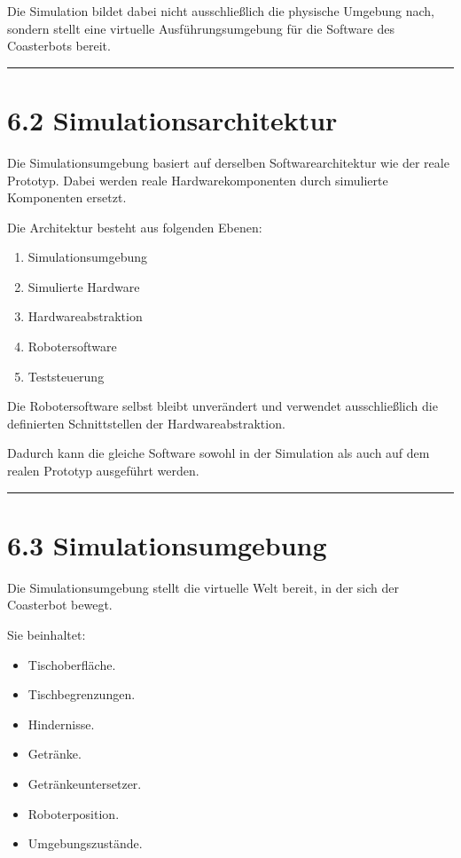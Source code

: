 \documentclass[
  a4paper,
  12pt,
  DIV=12,        %
  parskip=half,  %
  headings=small %
]{scrartcl}
\theoremstyle{definition}
\providecommand{\tightlist}{%
  \setlength{\itemsep}{0pt}\setlength{\parskip}{0pt}}
\theoremstyle{definition}
\providecommand{\tightlist}{%
  \setlength{\itemsep}{0pt}\setlength{\parskip}{0pt}}
\begin{document}
Die Simulation bildet dabei nicht ausschließlich die physische Umgebung
nach, sondern stellt eine virtuelle Ausführungsumgebung für die Software
des Coasterbots bereit.

\begin{center}\rule{0.5\linewidth}{0.5pt}\end{center}

\section{6.2 Simulationsarchitektur}\label{simulationsarchitektur-1}

Die Simulationsumgebung basiert auf derselben Softwarearchitektur wie
der reale Prototyp. Dabei werden reale Hardwarekomponenten durch
simulierte Komponenten ersetzt.

Die Architektur besteht aus folgenden Ebenen:

\begin{enumerate}
\def\labelenumi{\arabic{enumi}.}
\tightlist
\item
  Simulationsumgebung
\item
  Simulierte Hardware
\item
  Hardwareabstraktion
\item
  Robotersoftware
\item
  Teststeuerung
\end{enumerate}

Die Robotersoftware selbst bleibt unverändert und verwendet
ausschließlich die definierten Schnittstellen der Hardwareabstraktion.

Dadurch kann die gleiche Software sowohl in der Simulation als auch auf
dem realen Prototyp ausgeführt werden.

\begin{center}\rule{0.5\linewidth}{0.5pt}\end{center}

\section{6.3 Simulationsumgebung}\label{simulationsumgebung}

Die Simulationsumgebung stellt die virtuelle Welt bereit, in der sich
der Coasterbot bewegt.

Sie beinhaltet:

\begin{itemize}
\tightlist
\item
  Tischoberfläche.
\item
  Tischbegrenzungen.
\item
  Hindernisse.
\item
  Getränke.
\item
  Getränkeuntersetzer.
\item
  Roboterposition.
\item
  Umgebungszustände.
\end{itemize}
\end{document}
